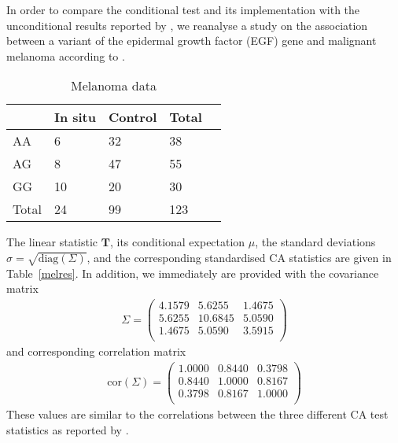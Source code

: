\documentclass[bimj,fleqn]{w-art}
\newcommand{\T}{\mathbf{T}}
\begin{document}
In order to compare the conditional test and its implementation with the
unconditional results reported by \citet{Freidlin:2002}, we reanalyse a study on the association
between a variant of the epidermal growth factor 
(EGF) gene and malignant melanoma according to
\citet[Table~\ref{mel},][]{Shahbazi:2002}.


\begin{table}
\begin{center}
\caption{Melanoma data \label{mel}}
\vspace*{0.5cm}
\begin{tabular}{l l l l l}
 &  In situ & Control & Total \\ \hline 
AA  &  6 & 32 & 38  \\ 
AG  &  8 & 47 & 55  \\ 
GG  &  10 & 20 & 30  \\ 
Total  &  24 & 99 & 123  \\ \hline
\end{tabular}
\end{center}
\end{table}



The linear statistic $\T$, its conditional expectation $\mu$,
the standard deviations $\sigma = \sqrt{\text{diag}(\Sigma)}$, and 
the corresponding standardised CA statistics are given in
Table~\ref{melres}. 
In addition, we immediately are provided with the covariance matrix
\begin{eqnarray*}
\Sigma = \left( \begin{array}{rrr} 
4.1579 & 5.6255 & 1.4675 \\ 
5.6255 & 10.6845 & 5.0590 \\ 
1.4675 & 5.0590 & 3.5915 \\ \end{array} \right)
\end{eqnarray*}
and corresponding correlation matrix
\begin{eqnarray*}
\text{cor}(\Sigma) = \left( \begin{array}{rrr} 
1.0000 & 0.8440 & 0.3798 \\ 
0.8440 & 1.0000 & 0.8167 \\ 
0.3798 & 0.8167 & 1.0000 \\ \end{array} \right)
\end{eqnarray*}
These values are similar to the correlations between the 
three different CA test statistics as reported by
\citet{Freidlin:2002}.
\end{document}

